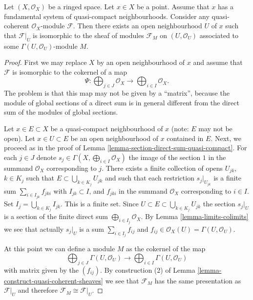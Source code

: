 \begin{lemma}
\label{lemma-quasi-coherent-module}
Let $(X, \mathcal{O}_X)$ be a ringed space.
Let $x \in X$ be a point.
Assume that $x$ has a fundamental system of quasi-compact neighbourhoods.
Consider any quasi-coherent $\mathcal{O}_X$-module $\mathcal{F}$.
Then there exists an open neighbourhood $U$ of $x$
such that $\mathcal{F}|_U$ is isomorphic to the
sheaf of modules $\mathcal{F}_M$ on $(U, \mathcal{O}_U)$
associated to some $\Gamma(U, \mathcal{O}_U)$-module $M$.
\end{lemma}

\begin{proof}
First we may replace $X$ by an open neighbourhood of $x$
and assume that $\mathcal{F}$ is isomorphic to the
cokernel of a map
$$
\Psi :
\bigoplus\nolimits_{j \in J}
\mathcal{O}_X
\longrightarrow
\bigoplus\nolimits_{i \in I}
\mathcal{O}_X.
$$
The problem is that this map may not be given by
a ``matrix'', because the module of global sections of a direct sum
is in general different from the direct sum of the modules
of global sections.

\medskip\noindent
Let $x \in E \subset X$ be a quasi-compact
neighbourhood of $x$ (note: $E$ may not be open).
Let $x \in U \subset E$ be an open neighbourhood of
$x$ contained in $E$.
Next, we proceed as in the proof of
Lemma \ref{lemma-section-direct-sum-quasi-compact}.
For each $j \in J$ denote
$s_j \in \Gamma(X, \bigoplus\nolimits_{i \in I} \mathcal{O}_X)$
the image of the section $1$ in the summand $\mathcal{O}_X$
corresponding to $j$. There exists a finite collection of opens
$U_{jk}$, $k \in K_j$ such that $E \subset \bigcup_{k \in K_j} U_{jk}$
and such that each restriction $s_j|_{U_{jk}}$
is a finite sum $\sum_{i \in I_{jk}} f_{jki}$
with $I_{jk} \subset I$, and $f_{jki}$ in the summand
$\mathcal{O}_X$ corresponding to $i \in I$. Set
$I_j = \bigcup_{k \in K_j} I_{jk}$. This is a finite set.
Since $U \subset E \subset \bigcup_{k \in K_j} U_{jk}$
the section $s_j|_U$ is a section of the finite direct sum
$\bigoplus_{i \in I_j} \mathcal{O}_X$.
By Lemma \ref{lemma-limits-colimits}
we see that actually $s_j|_U$ is a sum
$\sum_{i \in I_j} f_{ij}$ and
$f_{ij} \in \mathcal{O}_X(U) = \Gamma(U, \mathcal{O}_U)$.

\medskip\noindent
At this point we can define a module $M$ as the cokernel of the map
$$
\bigoplus\nolimits_{j \in J}
\Gamma(U, \mathcal{O}_U)
\longrightarrow
\bigoplus\nolimits_{i \in I}
\Gamma(U, \mathcal{O}_U)
$$
with matrix given by the $(f_{ij})$. By construction (2) of
Lemma \ref{lemma-construct-quasi-coherent-sheaves} we see that
$\mathcal{F}_M$ has the same presentation as $\mathcal{F}|_U$
and therefore $\mathcal{F}_M \cong \mathcal{F}|_U$.
\end{proof}

